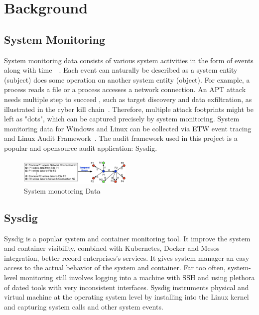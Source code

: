 \section{Background}
\subsection{System Monitoring}
System monitoring data consists of various system activities in the form of events along with time~~\cite{backtracking, backtracking2, taser,wormlog}. Each event can naturally be described as a system entity (subject) does some operation on another system entity (object). For example, a process reads a file or a process accesses a network connection. An APT attack needs multiple step to succeed , such as target discovery and data exfiltration, as illustrated in the cyber kill chain~\cite{killchain}. Therefore, multiple attack footprints might be left as "dots", which can be captured precisely by system monitoring. System monitoring data for Windows and Linux can be collected via ETW event tracing~\cite{etw} and Linux Audit Framework~\cite{auditd}. The audit framework used in this project is a popular and opensource audit application: Sysdig.
\begin{figure}
	\centering
	\includegraphics[width=0.48\textwidth]{temporal-graph.jpg}
	\caption{System monotoring Data}
	\label{fig:temporalGraph}
\end{figure}
\subsection{Sysdig}
Sysdig is a popular system and container monitoring tool. It improve the system and container visibility, combined with Kubernetes, Docker and Mesos integration, better record enterprises's services. It gives system manager an easy access to the actual behavior of the system and container. Far too often, system-level monitoring still involves logging into a machine with SSH and using plethora of dated tools with very inconsistent interfaces. Sysdig instruments physical and virtual machine at the operating system level by installing into the Linux kernel and capturing system calls and other system events.
